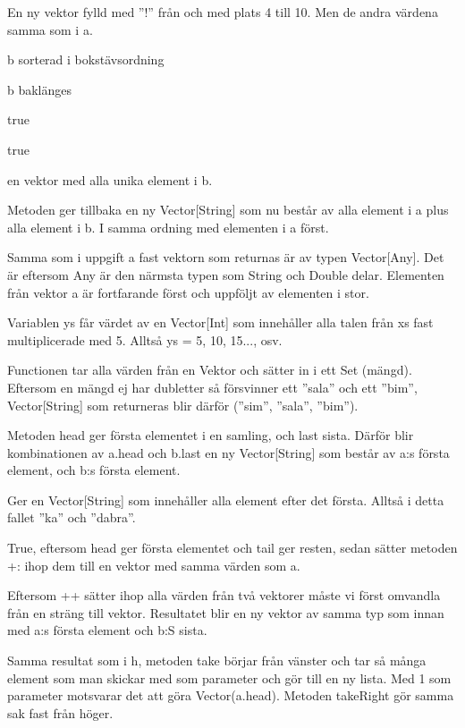 \Subtask  En ny vektor fylld med ''!'' från och med plats 4 till 10. Men de andra värdena samma som i a.

\Subtask  b sorterad i bokstävsordning

\Subtask  b baklänges

\Subtask  true

\Subtask  true

\Subtask  en vektor med alla unika element i b.

\Task %

\Subtask 
Metoden ger tillbaka en ny Vector[String] som nu består av alla element i a plus alla element i b. I samma ordning med elementen i a först.

\Subtask 
Samma som i uppgift a fast vektorn som returnas är av typen Vector[Any]. Det är eftersom Any är den närmsta typen som String och Double delar. Elementen från vektor a är fortfarande först och uppföljt av elementen i stor.

\Subtask 
Variablen ys får värdet av en Vector[Int] som innehåller alla talen från xs fast multiplicerade med 5. Alltså ys = 5, 10, 15..., osv.

\Subtask 
Functionen tar alla värden från en Vektor och sätter in i ett Set (mängd). Eftersom en mängd ej har dubletter så försvinner ett ''sala'' och ett ''bim'', Vector[String] som returneras blir därför (''sim'', ''sala'', ''bim'').

\Subtask 
Metoden head ger första elementet i en samling, och last sista. Därför blir kombinationen av a.head och b.last en ny Vector[String] som består av a:s första element, och b:s första element.

\Subtask 
Ger en Vector[String] som innehåller alla element efter det första. Alltså i detta fallet ''ka'' och ''dabra''.

\Subtask 
True, eftersom head ger första elementet och tail ger resten, sedan sätter metoden +: ihop dem till en vektor med samma värden som a.

\Subtask 
Eftersom ++ sätter ihop alla värden från två vektorer måste vi först omvandla från en sträng till vektor. Resultatet blir en ny vektor av samma typ som innan med a:s första element och b:S sista.

\Subtask 
Samma resultat som i h, metoden take börjar från vänster och tar så många element som man skickar med som parameter och gör till en ny lista. Med 1 som parameter motsvarar det att göra Vector(a.head). Metoden takeRight gör samma sak fast från höger.

